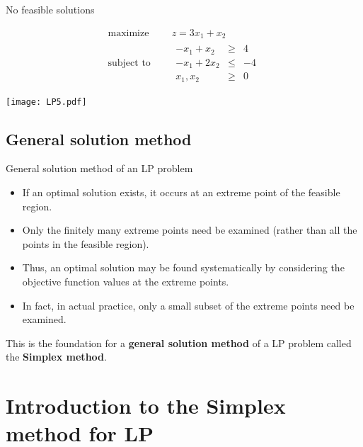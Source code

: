 \documentclass[c]{beamer}
\begin{document}
\begin{frame}[allowframebreaks]{No feasible solutions}
  \begin{Exercise}
    \begin{equation*}
      \begin{aligned}
        \text{maximize } \quad & z = 3x_1 + x_2 \\
        \text{subject to }\quad &
        \begin{array}{rcl}
          -x_1 + x_2 &\geq& 4\\
          -x_1 +2x_2 &\leq& -4\\
          x_1,x_2 &\geq &0
        \end{array}
      \end{aligned}
    \end{equation*}
  \end{Exercise}
  \framebreak
  \begin{center}
    \texttt{[image: LP5.pdf]}
  \end{center}

\end{frame}

\subsection{General solution method}

\begin{frame}{General solution method of an LP problem}
  \begin{itemize}
    \item If an optimal solution exists, it occurs at an extreme point of the feasible region.
    \item Only the finitely many extreme points need be examined (rather than all the points in the feasible region).
    \item Thus, an optimal solution may be found systematically by considering the objective function values at the extreme points.
    \item In fact, in actual practice, only a small subset of the extreme points need be examined.
  \end{itemize}
  This is the foundation for a {\bf general solution method} of a LP problem called the {\bf Simplex method}.
\end{frame}

\section{Introduction to the Simplex method for LP}
\end{document}
